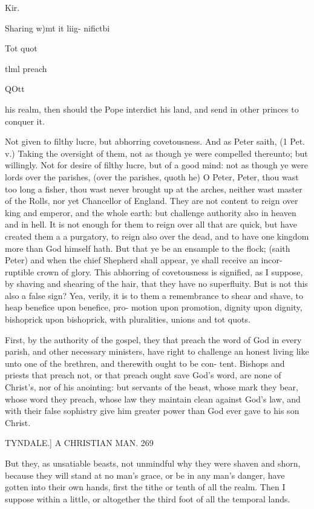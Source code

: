 \documentclass{custom}
\begin{document}
{Kir. 

Sharing 
w)mt it liig- 
nifictbi 

Tot quot 

tlml preach 

QOtt 

his realm, then should the Pope interdict his land, and 
send in other princes to conquer it. 

Not given to filthy lucre, but abhorring covetousness. 
And as Peter saith, (1 Pet. v.) Taking the oversight of 
them, not as though ye were compelled thereunto; but 
willingly. Not for desire of filthy lucre, but of a good 
mind: not as though ye were lords over the parishes, (over 
the parishes, quoth he) O Peter, Peter, thou wast too 
long a fisher, thou wast never brought up at the arches, 
neither wast master of the Rolls, nor yet Chancellor of 
England. They are not content to reign over king and 
emperor, and the whole earth: but challenge authority 
also in heaven and in hell. It is not enough for them to 
reign over all that are quick, but have created them a 
a purgatory, to reign also over the dead, and to have one 
kingdom more than God himself hath. But that ye be 
an ensample to the flock; (saith Peter) and when the 
chief Shepherd shall appear, ye shall receive an incor- 
ruptible crown of glory. This abhorring of covetousness 
is signified, as I suppose, by shaving and shearing of the 
hair, that they have no superfluity. But is not this also 
a false sign? Yea, verily, it is to them a remembrance 
to shear and shave, to heap benefice upon benefice, pro- 
motion upon promotion, dignity upon dignity, bishoprick 
upon bishoprick, with pluralities, unions and tot quots. 

First, by the authority of the gospel, they that preach 
the word of God in every parish, and other necessary 
ministers, have right to challenge an honest living like 
unto one of the brethren, and therewith ought to be con- 
tent. Bishops and priests that preach not, or that preach 
ought save God's word, are none of Christ's, nor of his 
anointing: but servants of the beast, whose mark they 
bear, whose word they preach, whose law they maintain 
clean against God's law, and with their false sophistry give 
him greater power than God ever gave to his son Christ. 


TYNDALE.]
A CHRISTIAN MAN.
269

But they, as unsatiable beasts, not unmindful why they 
were shaven and shorn, because they will stand at no man's 
grace, or be in any man's danger, have gotten into their 
own hands, first the tithe or tenth of all the realm. Then 
I suppose within a little, or altogether the third foot of 
all the temporal lands. 

}
\end{document}
